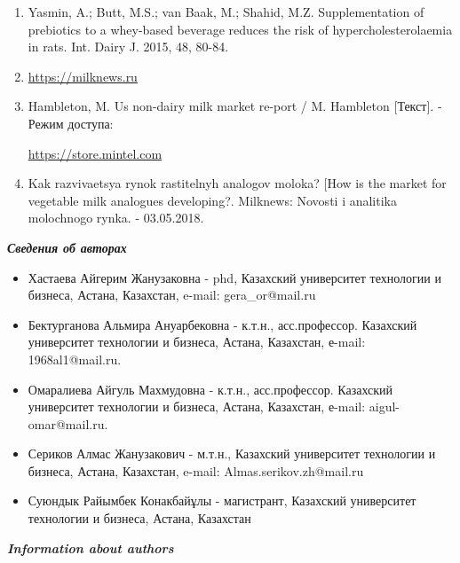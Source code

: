 \begin{enumerate}
\item
Yasmin, A.; Butt, M.S.; van Baak, M.; Shahid, M.Z. Supplementation of
prebiotics to a whey-based beverage reduces the risk of
hypercholesterolaemia in rats. Int. Dairy J. 2015, 48, 80-84.

\item
\href{https://milknews.ru/longridy/rastitelniye-analogi-moloka.html}{https://milknews.ru}

\item
Hambleton, M. Us non-dairy milk market re-port / M. Hambleton
{[}Текст{]}. - Режим доступа:

\href{https://store.mintel.com/US-NON-DAIRY-MILK-MAR-KET-REPORT}{https://store.mintel.com}

\item
Kak razvivaetsya rynok rastitel\textquotesingle nyh analogov moloka?
{[}How is the market for vegetable milk analogues developing?. Milknews:
Novosti i analitika molochnogo rynka. - 03.05.2018.
\end{enumerate}

\emph{{\bfseries Сведения об авторах}}

\begin{itemize}
\item
Хастаева Айгерим Жанузаковна - phd, Казахский университет технологии и
бизнеса, Астана, Казахстан, e-mail: gera\_or@mail.ru

\item
Бектурганова Альмира Ануарбековна - к.т.н., асс.профессор. Казахский
университет технологии и бизнеса, Астана, Казахстан, е-mail:
1968al1@mail.ru.

\item
Омаралиева Айгуль Махмудовна - к.т.н., асс.профессор. Казахский
университет технологии и бизнеса, Астана, Казахстан, е-mail:
aigul-omar@mail.ru.

\item
Сериков Алмас Жанузакович - м.т.н., Казахский университет технологии и
бизнеса, Астана, Казахстан, e-mail: Almas.serikov.zh@mail.ru

\item
Суюндык Райымбек Конакбайұлы - магистрант, Казахский университет
технологии и бизнеса, Астана, Казахстан
\end{itemize}

\emph{{\bfseries Information about authors}}


